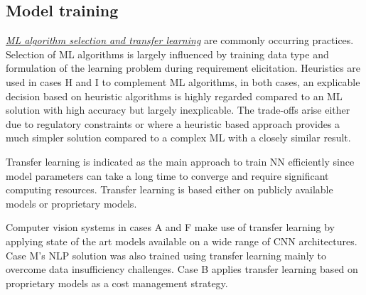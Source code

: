 \subsection{Model training}

\underline{\emph{ML algorithm selection and transfer learning}}
are commonly occurring practices. Selection of ML algorithms is largely influenced by training data type and formulation of the learning problem during requirement elicitation. Heuristics are used in cases H and I to complement ML algorithms, in both cases, an explicable decision based on heuristic algorithms is highly regarded compared to an ML solution with high accuracy but largely inexplicable. The trade-offs arise either due to regulatory constraints or where a heuristic based approach provides a much simpler solution compared to a complex ML with a closely similar result.


Transfer learning is indicated as the main approach to train NN efficiently since model parameters can take a long time to converge and require significant computing resources. Transfer learning is based either on publicly available models or proprietary models. 

Computer vision systems in cases A and F make use of transfer learning by applying state of the art models available on a wide range of CNN architectures. Case M's NLP solution was also trained using transfer learning mainly to overcome data insufficiency challenges. Case B applies transfer learning based on proprietary models as a cost management strategy. 

